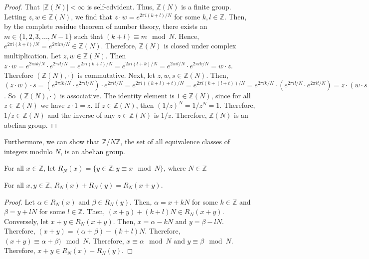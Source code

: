 \documentclass[../article.tex]{subfiles}
\begin{document}
\begin{proof}
That $| \mathbb{Z}(N)| < \infty$ is self-edvident. Thus, $\mathbb{Z}(N)$ is a finite group. Letting $z,w \in \mathbb{Z}(N)$, we find that $z \cdot w = e^{2 \pi i (k+l)/N}$ for some $k,l \in \mathbb{Z}$. Then, by the complete residue theorem of number theory, there exists an $m \in \{1, 2, 3, ..., N-1\}$ such that $(k+l) \equiv m \mod N$. Hence, $e^{2 \pi i (k+l)/N} = e^{2 \pi i m/N} \in \mathbb{Z}(N)$. Therefore, $\mathbb{Z}(N)$ is closed under complex multiplication. Let $z,w \in \mathbb{Z}(N)$. Then $z \cdot w = e^{2 \pi i k/N} \cdot e^{2 \pi i l/N} = e^{2 \pi i (k+l)/N} = e^{2 \pi i (l+k)/N} = e^{2 \pi i l/N} \cdot e^{2 \pi i k/N} = w \cdot z$. Therefore $(\mathbb{Z}(N), \cdot)$ is commutative. Next, let $z,w,s \in \mathbb{Z}(N)$. Then, $(z \cdot w) \cdot s = (e^{2 \pi i k/N} \cdot e^{2 \pi i l/N}) \cdot e^{2 \pi i t/N} = e^{2 \pi i ((k+l)+t)/N} = e^{2 \pi i (k+(l+t))/N} = e^{2 \pi i k/N} \cdot (e^{2 \pi i l/N} \cdot e^{2 \pi i t/N}) = z \cdot (w \cdot s)$. So $(\mathbb{Z}(N), \cdot)$ is associative. The identity element is $1 \in \mathbb{Z}(N)$, since for all $z \in \mathbb{Z}(N)$ we have $z \cdot 1 = z$. If $z \in \mathbb{Z}(N)$, then $(1/z)^N = 1/ z^N = 1$. Therefore, $1/z \in \mathbb{Z}(N)$ and the inverse of any $z \in \mathbb{Z}(N)$ is $1/z$. Therefore, $\mathbb{Z}(N)$ is an abelian group.
\end{proof}

Furthermore, we can show that $\mathbb{Z}/ N\mathbb{Z}$, the set of all equivalence classes of integers modulo $N$, is an abelian group. 

\begin{definition}
For all $x \in \mathbb{Z}$, let $R_N (x) = \{y \in \mathbb{Z} : y \equiv x   \mod   N\}$, where $N \in \mathbb{Z}$
\end{definition}
\begin{theorem}
For all $x,y \in \mathbb{Z}$, $R_N (x) + R_N (y) = R_N (x+y).$
\end{theorem}
\begin{proof}
Let $\alpha \in R_N (x)$ and $\beta \in R_N (y)$. Then, $\alpha = x +kN$ for some $k \in \mathbb{Z}$ and $\beta = y + lN$ for some $l \in \mathbb{Z}$. Then, $(x+y)+(k+l)N \in R_N (x+y)$. Conversely, let $x+y \in R_N (x+y)$. Then, $x = \alpha -kN$ and $y = \beta -lN$. Therefore, $(x+y) = (\alpha + \beta) -(k+l)N$. Therefore, $(x+y) \equiv \alpha +\beta) \mod N$. Therefore, $x \equiv \alpha \mod N$ and $y \equiv \beta \mod N$. Therefore, $x+y \in R_N (x) + R_N (y)$.
\end{proof}
\end{document}
